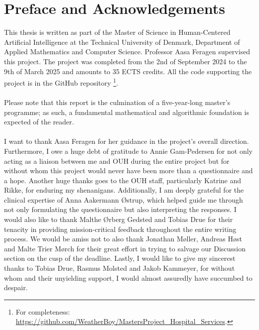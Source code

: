 \section*{Preface and Acknowledgements}
This thesis is written as part of the Master of Science in Human-Centered Artificial Intelligence at the Technical University of Denmark, Department of Applied Mathematics and Computer Science. Professor Aasa Feragen supervised this project. The project was completed from the 2nd of September 2024 to the 9th of March 2025 and amounts to 35 ECTS credits. All the code supporting the project is in the GitHub repository \footnote{For completeness: \href{https://github.com/WeatherBoy/MastersProject_Hospital_Services}{https://github.com/WeatherBoy/MastersProject\_Hospital\_Services}.}.
\\
\\
Please note that this report is the culmination of a five-year-long master's programme; as such, a fundamental mathematical and algorithmic foundation is expected of the reader.
\\
\\
I want to thank Aasa Feragen for her guidance in the project's overall direction. Furthermore, I owe a huge debt of gratitude to Annie Gam-Pedersen for not only acting as a liaison between me and OUH during the entire project but for without whom this project would never have been more than a questionnaire and a hope. Another huge thanks goes to the OUH staff, particularly Katrine and Rikke, for enduring my shenanigans. Additionally, I am deeply grateful for the clinical expertise of Anna Aakermann \O strup, which helped guide me through not only formulating the questionnaire but also interpreting the responses.
I would also like to thank Malthe \O rberg Gedsted and Tobias Drue for their tenacity in providing mission-critical feedback throughout the entire writing process. We would be amiss not to also thank Jonathan M\o ller, Andreas H\o st and Malte Trier M\o rch for their great effort in trying to salvage our Discussion section on the cusp of the deadline.
Lastly, I would like to give my sincerest thanks to Tobias Drue, Rasmus Molsted and Jakob Kammeyer, for without whom and their unyielding support, I would almost assuredly have succumbed to despair.